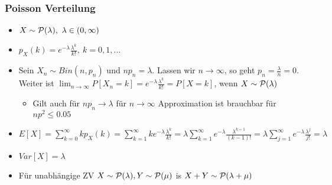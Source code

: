 \subsubsection{Poisson Verteilung}
\begin{itemize}
    \item $X \sim \mathcal{P}(\lambda), \ \lambda \in (0, \infty)$
    \item $p_X(k) = e^{-\lambda} \frac{\lambda^k}{k!}, \ k = 0, 1, \dots$
    \item Sein $X_n \sim Bin(n, p_n)$ und $np_n = \lambda$. Lassen wir $n \to \infty$, so geht $p_n = \frac{\lambda}{n} = 0$. Weiter ist $\lim_{n \to \infty} P[X_n = k] = e^{-\lambda} \frac{\lambda^k}{k!} = P[X = k]$, wenn $X \sim \mathcal{P}(\lambda)$
        \begin{itemize}
            \item Gilt auch für $np_n \to \lambda$ für $n \to \infty$
             Approximation ist brauchbar für $np^2 \le 0.05$
        \end{itemize}
    \item $E[X] = \sum_{k=0}^{\infty} kp_X(k) = \sum_{k=1}^{\infty} ke^{-\lambda} \frac{\lambda^k}{k!} = \lambda \sum_{k=1}^{\infty} e^{-\lambda} \frac{\lambda^{k - 1}}{(k - 1)!} = \lambda \sum_{j=1}^{\infty} e^{-\lambda} \frac{\lambda^j}{j!} = \lambda$
    \item $Var[X] = \lambda$
    \item Für unabhängige ZV $X \sim \mathcal{P}(\lambda), Y \sim \mathcal{P}(\mu)$ is $X + Y \sim \mathcal{P}(\lambda + \mu)$
\end{itemize}
